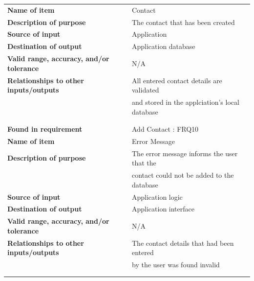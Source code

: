\begin{tabular}{ll}
\textbf{Name of item}&Contact\\
\textbf{Description of purpose}&The contact that has been created\\
\textbf{Source of input}&Application\\
\textbf{Destination of output}&Application database\\
\textbf{Valid range, accuracy, and/or tolerance}&N/A\\
\textbf{Relationships to other inputs/outputs}&All entered contact details are validated\\& and stored in the applciation's local database\\
&\\
&\\
\textbf{Found in requirement}&Add Contact : FRQ10\\
\textbf{Name of item}&Error Message\\
\textbf{Description of purpose}&The error message informs the user that the\\& contact could not be added to the database\\
\textbf{Source of input}&Application logic\\
\textbf{Destination of output}&Application interface\\
\textbf{Valid range, accuracy, and/or tolerance}&N/A\\
\textbf{Relationships to other inputs/outputs}&The contact details that had been entered\\& by the user was found invalid\\
&\\
&\\
\end{tabular}
\newpage

